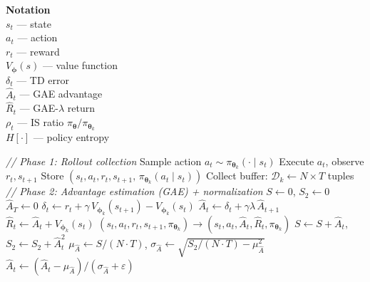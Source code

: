 \documentclass[11pt]{article}
\begin{document}
\begin{algorithm}[p]
\begin{minipage}[t]{0.28\linewidth}
\vspace{6pt}
\textbf{Notation} \\[2pt]
$s_t$ — state \\
$a_t$ — action \\
$r_t$ — reward \\
$V_{\boldsymbol{\phi}}(s)$ — value function \\
$\delta_t$ — TD error \\
$\hat{A}_t$ — GAE advantage \\
$\hat{R}_t$ — GAE-$\lambda$ return \\
$\rho_t$ — IS ratio $\pi_{\boldsymbol{\theta}} / \pi_{\boldsymbol{\theta}_k}$ \\
$H[\cdot]$ — policy entropy
\end{minipage}%
\hfill
\vrule
\hfill
\begin{minipage}[t]{0.68\linewidth}
\begin{algorithmic}[1]
    \Statex \hspace{\algorithmicindent}\textit{// Phase 1: Rollout collection}
            \State Sample action $a_t \sim \pi_{\boldsymbol{\theta}_k}(\cdot \mid s_t)$
            \State Execute $a_t$, observe $r_t, s_{t+1}$
            \State Store $(s_t, a_t, r_t, s_{t+1},\, \pi_{\boldsymbol{\theta}_k}(a_t \mid s_t))$
        \EndFor
    \EndFor
    \State Collect buffer: $\mathcal{D}_k \gets N \!\times\! T$ tuples
    \Statex \hspace{\algorithmicindent}\textit{// Phase 2: Advantage estimation (GAE) + normalization}
    \State $S \gets 0$, \; $S_2 \gets 0$
        \State $\hat{A}_T \gets 0$
            \State $\delta_t \gets r_t + \gamma\, V_{\boldsymbol{\phi}_k}(s_{t+1}) - V_{\boldsymbol{\phi}_k}(s_t)$
            \State $\hat{A}_t \gets \delta_t + \gamma \lambda\, \hat{A}_{t+1}$
            \State $\hat{R}_t \gets \hat{A}_t + V_{\boldsymbol{\phi}_k}(s_t)$
            \State $(s_t, a_t, r_t, s_{t+1}, \pi_{\boldsymbol{\theta}_k}) \!\to\! (s_t, a_t, \hat{A}_t, \hat{R}_t, \pi_{\boldsymbol{\theta}_k})$
            \State $S \gets S + \hat{A}_t$, \; $S_2 \gets S_2 + \hat{A}_t^2$
        \EndFor
    \EndFor
    \State $\mu_{\hat{A}} \gets S / (N \!\cdot\! T)$, \; $\sigma_{\hat{A}} \gets \sqrt{S_2 / (N \!\cdot\! T) - \mu_{\hat{A}}^2}$
        \State $\hat{A}_t \gets (\hat{A}_t - \mu_{\hat{A}}) / (\sigma_{\hat{A}} + \varepsilon)$
    \EndFor

\end{algorithmic}
\end{minipage}
\end{algorithm}
\end{document}
